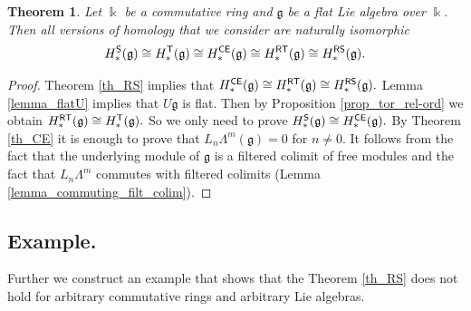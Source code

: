 \documentclass{amsart}
\numberwithin{equation}{section}
\newtheorem{theorem}{Theorem}[section]
\theoremstyle{definition}
\def\gg{\mathfrak{g}}
\def\kk{\Bbbk}
\begin{document}
\begin{theorem}\label{th_flat}
Let $\kk$ be a commutative ring and $\gg$ be a flat Lie algebra over $\kk.$ Then all versions of homology that we consider are naturally isomorphic
$$H^{\sf S}_*(\gg) \cong H^{\sf T}_*(\gg)\cong H^{\sf CE}_*(\gg)\cong  H^{\sf RT}_*(\gg)\cong H^{\sf RS}_*(\gg).$$
\end{theorem}
\begin{proof}
Theorem \ref{th_RS} implies that $H^{\sf CE}_*(\gg)\cong  H^{\sf RT}_*(\gg)\cong H^{\sf RS}_*(\gg).$ Lemma \ref{lemma_flatU} implies that $U\gg$ is flat.  Then by Proposition \ref{prop_tor_rel-ord} we obtain $H_*^{\sf RT}(\gg)\cong H_*^{\sf T}(\gg).$ So we only need to prove $H^{\sf S}_*(\gg)\cong H_*^{\sf CE}(\gg).$ By Theorem \ref{th_CE} it is enough to prove that $L_n\Lambda^m(\gg)=0$ for $n\ne 0.$ It follows from the fact that the underlying module of $\gg$ is a filtered colimit of free modules and the fact that $L_n\Lambda^m$ commutes with filtered colimits (Lemma \ref{lemma_commuting_filt_colim}). 
\end{proof}

 

\subsection{Example.} 

Further we construct an example that shows that the Theorem \ref{th_RS} does not hold for arbitrary commutative rings and arbitrary Lie algebras. 
\end{document}
